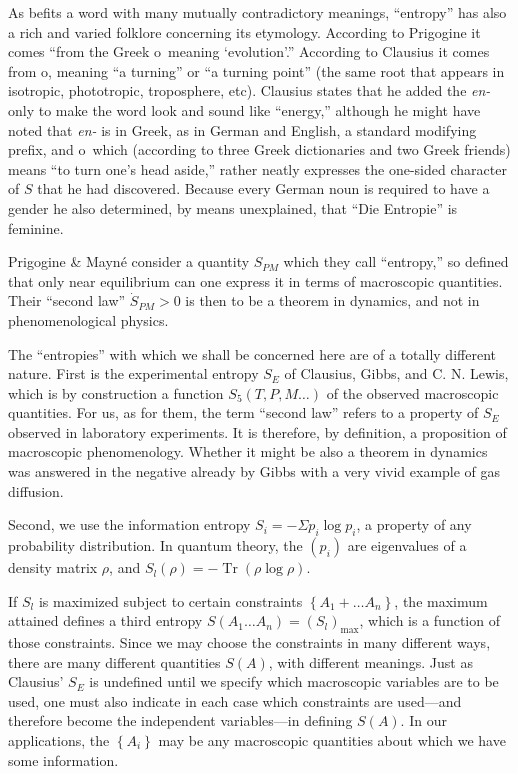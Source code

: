 \documentclass{article}
\begin{document}
As befits a word with many mutually contradictory meanings, ``entropy'' has also a rich and varied folklore concerning its etymology. According to Prigogine \cite{prigogine1961} it comes ``from the Greek \textepsilon\textnu\texttau\textrho o\textpi\texteta\ meaning `evolution'.'' According to Clausius \cite{clausius1865} it comes from \texttau\textrho o\textpi\texteta, meaning ``a turning'' or ``a turning point'' (the same root that appears in isotropic, phototropic, troposphere, etc). Clausius states that he added the \emph{en-} only to make the word look and sound like ``energy,'' although he might have noted that \emph{en-} is in Greek, as in German and English, a standard modifying prefix, and \textepsilon\textnu\texttau\textrho o\textpi\texteta\ which (according to three Greek dictionaries and two Greek friends) means ``to turn one's head aside,'' rather neatly expresses the one-sided character of $S$ that he had discovered. Because every German noun is required to have a gender he also determined, by means unexplained, that ``Die Entropie'' is feminine.

Prigogine \& Mayné \cite{prigogine1974} consider a quantity $S_{P M}$ which they call ``entropy,'' so defined that only near equilibrium can one express it in terms of macroscopic quantities. Their ``second law'' $\dot{S}_{P M}>0$ is then to be a theorem in dynamics, and not in phenomenological physics.

The ``entropies'' with which we shall be concerned here are of a totally different nature. First is the experimental entropy $S_E$ of Clausius, Gibbs, and C. N. Lewis, which is by construction a function $S_5(T, P, M \ldots)$ of the observed macroscopic quantities. For us, as for them, the term ``second law'' refers to a property of $S_E$ observed in laboratory experiments. It is therefore, by definition, a proposition of macroscopic phenomenology. Whether it might be also a theorem in dynamics was answered in the negative already by Gibbs \cite{gibbs1876} with a very vivid example of gas diffusion.

Second, we use the information entropy $S_i=-\Sigma p_i \log p_i$, a property of any probability distribution. In quantum theory, the $\left(p_i\right)$ are eigenvalues of a density matrix $\rho$, and $S_l(\rho)=-\operatorname{Tr}(\rho \log \rho)$.

If $S_l$ is maximized subject to certain constraints $\left\{A_1+\ldots A_n\right\}$, the maximum attained defines a third entropy $S\left(A_1 \ldots A_n\right)=\left(S_l\right)_{\max }$, which is a function of those constraints. Since we may choose the constraints in many different ways, there are many different quantities $S(A)$, with different meanings. Just as Clausius' $S_E$ is undefined until we specify which macroscopic variables are to be used, one must also indicate in each case which constraints are used---and therefore become the independent variables---in defining $S(A)$. In our applications, the $\left\{A_i\right\}$ may be any macroscopic quantities about which we have some information.
\end{document}
